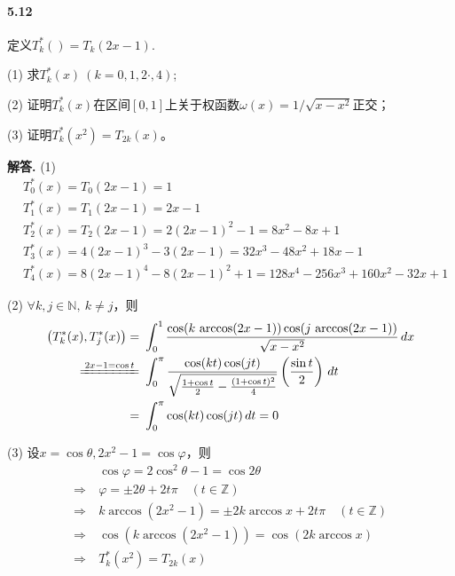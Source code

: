 \documentclass[12pt, a4paper, oneside]{ctexart}
\newenvironment{solution}{\par\noindent\textbf{解答. }}{\bigskip\par}
\begin{document}
\paragraph{5.12}定义$T_k^*()=T_k(2x-1)$.

(1) 求$T_k^*(x)\ (k=0,1,2\cdot,4)$;

(2) 证明$T_k^*(x)$在区间$[0,1]$上关于权函数$\omega(x)=1/\sqrt{x-x^2}$正交；

(3) 证明$T_k^*(x^2)=T_{2k}(x)$。
\begin{solution}
    (1) \begin{equation*}
        \begin{aligned}
            &T_0^*(x) = T_0(2x-1)=1\\
            &T_1^*(x)=T_1(2x-1)=2x-1\\
            &T_2^*(x)=T_2(2x-1)=2(2x-1)^2-1=8x^2-8x+1\\
            &T_3^*(x) = 4(2x-1)^3-3(2x-1) = 32x^3-48x^2+18x-1\\
            &T_4^*(x) = 8(2x-1)^4-8(2x-1)^2+1=128x^4-256x^3+160x^2-32x+1
        \end{aligned}
    \end{equation*}
    
    (2) $\forall k, j\in\mathbb{N},\ k\neq j$，则
    \begin{equation*}
        \begin{aligned}
            \left(T_k^*(x),T_j^*(x)\right)=&\ \int_0^1\frac{\cos(k\, \arccos(2x-1))\cos(j\, \arccos(2x-1))}{\sqrt{x-x^2}}\,dx\\
            \xlongequal{2x-1=\cos t}&\ \int_0^\pi\frac{\cos(kt)\cos(jt)}{\sqrt{\frac{1+\cos t}{2}-\frac{(1+\cos t)^2}{4}}}\left(\frac{\sin t}{2}\right)\,dt\\
            =&\ \int_0^\pi\cos(kt)\cos(jt)\,dt=0
        \end{aligned}
    \end{equation*}

    (3) 设$x = \cos\theta, 2x^2-1=\cos\varphi$，则
    \begin{equation*}
        \begin{aligned}
            &\ \cos\varphi = 2\cos^2\theta-1=\cos 2\theta\\
            \Rightarrow&\ \varphi=\pm2\theta+2t\pi\quad(t\in\mathbb{Z})\\
            \Rightarrow&\ k\arccos(2x^2-1)=\pm2k\arccos x+2t\pi\quad (t\in\mathbb{Z})\\
            \Rightarrow&\ \cos(k\arccos(2x^2-1))=\cos(2k\arccos x)\\
            \Rightarrow&\ T_k^*(x^2)=T_{2k}(x)
        \end{aligned}
    \end{equation*}
\end{solution}
\end{document}
